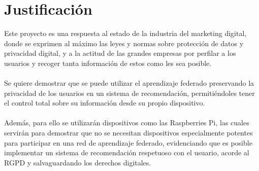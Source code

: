 \section{Justificación}
Este proyecto es una respuesta al estado de la industria del marketing digital, donde se exprimen al máximo las leyes y normas sobre protección de datos y privacidad digital, y a la actitud de las grandes empresas por perfilar a los usuarios y recoger tanta información de estos como les sea posible.
\\\\
Se quiere demostrar que se puede utilizar el aprendizaje federado preservando la privacidad de los usuarios en un sistema de recomendación, permitiéndoles tener el control total sobre su información desde su propio dispositivo. 
\\ \\
Además, para ello se utilizarán dispositivos como las Raspberries Pi, las cuales servirán para demostrar que no se necesitan dispositivos especialmente potentes para participar en una red de aprendizaje federado, evidenciando que es posible implementar un sistema de recomendación respetuoso con el usuario, acorde al RGPD y salvaguardando los derechos digitales.
